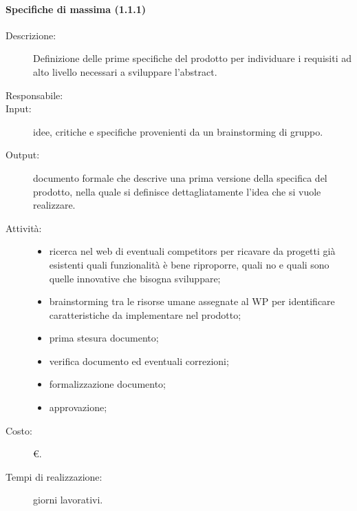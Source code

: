 \paragraph{Specifiche di massima (1.1.1)}
\begin{description}
\item[Descrizione:] Definizione delle prime specifiche del prodotto per individuare i requisiti ad alto livello necessari a sviluppare l'abstract.
\item[Responsabile:]
\item[Input:] idee, critiche e specifiche provenienti da un brainstorming di gruppo.
\item[Output:] documento formale che descrive una prima versione della specifica del prodotto, nella quale si definisce dettagliatamente l'idea che si vuole realizzare.
\item[Attività:]
\begin{itemize}
\item ricerca nel web di eventuali competitors per ricavare da progetti già esistenti quali funzionalità è bene riproporre, quali no e quali sono quelle innovative che bisogna sviluppare;
\item brainstorming tra le risorse umane assegnate al WP per identificare caratteristiche da implementare nel prodotto;
\item prima stesura documento;
\item verifica documento ed eventuali correzioni;
\item formalizzazione documento;
\item approvazione;
\end{itemize}
\item[Costo:] \euro{}.
\item[Tempi di realizzazione:] giorni lavorativi.
\end{description}

